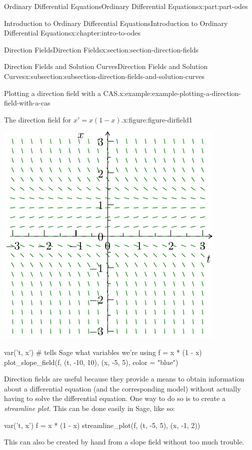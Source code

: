 \documentclass[twoside,10pt,]{book}
\numberwithin{equation}{part}
\begin{document}
\begin{partptx}{Ordinary Differential Equations}{}{Ordinary Differential Equations}{}{}{x:part:part-odes}
\begin{chapterptx}{Introduction to Ordinary Differential Equations}{}{Introduction to Ordinary Differential Equations}{}{}{x:chapter:intro-to-odes}
\begin{sectionptx}{Direction Fields}{}{Direction Fields}{}{}{x:section:section-direction-fields}
\begin{subsectionptx}{Direction Fields and Solution Curves}{}{Direction Fields and Solution Curves}{}{}{x:subsection:subsection-direction-fields-and-solution-curves}
\begin{example}{Plotting a direction field with a CAS.}{x:example:example-plotting-a-direction-field-with-a-cas}
\begin{figureptx}{The direction field for \(x' = x(1-x)\).}{x:figure:figure-dirfield1}{}%
\begin{image}{0.25}{0.5}{0.25}%
\includegraphics[width=\linewidth]{generated/asymptote/image-4.pdf}
\end{image}%
\tcblower
\end{figureptx}%
\end{example}
\begin{sageinput}
var('t, x')    # tells Sage what variables we're using
f = x * (1 - x)
plot_slope_field(f, (t, -10, 10), (x, -5, 5), color = "blue")
\end{sageinput}
Direction fields are useful because they provide a means to obtain information about a differential equation (and the corresponding model) without actually having to solve the differential equation. One way to do so is to create a \emph{streamline plot}. This can be done easily in Sage, like so: \begin{sageinput}
var('t, x')
f = x * (1 - x)
streamline_plot(f, (t, -5, 5), (x, -1, 2))
\end{sageinput}
 This can also be created by hand from a slope field without too much trouble.%
\par

\end{subsectionptx}
\end{sectionptx}
\end{chapterptx}
\end{partptx}
\end{document}
